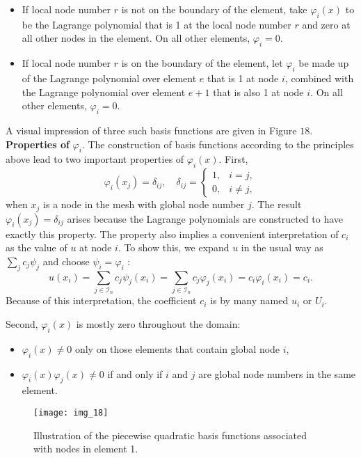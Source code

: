 \documentclass[../main.tex]{subfiles}
\begin{document}
\begin{itemize}
	\item If local node number $r$ is not on the boundary of the element, take $\varphi_{i}(x)$ to be the Lagrange polynomial that is 1 at the local node number $r$ and zero at all other nodes in the element. On all other elements, $\varphi_{i}=0$.
	\item If local node number $r$ is on the boundary of the element, let $\varphi_{i}$ be made up of the Lagrange polynomial over element $e$ that is 1 at node $i$, combined with the Lagrange polynomial over element $e+1$ that is also 1 at node $i$. On all other elements, $\varphi_{i}=0$.
\end{itemize}
A visual impression of three such basis functions are given in Figure $18 .$
\bigbreak
\noindent \textbf{Properties of} $\varphi_{i}$. The construction of basis functions according to the principles above lead to two important properties of $\varphi_{i}(x)$. First,
\begin{equation}\label{eqa52}
	\varphi_{i}\left(x_{j}\right)=\delta_{i j}, \quad \delta_{i j}= \begin{cases}1, & i=j, \\ 0, & i \neq j,\end{cases}
\end{equation}
when $x_{j}$ is a node in the mesh with global node number $j$. The result $\varphi_{i}\left(x_{j}\right)=\delta_{i j}$ arises because the Lagrange polynomials are constructed to have exactly this property. The property also implies a convenient interpretation of $c_{i}$ as the value of $u$ at node $i$. To show this, we expand $u$ in the usual way as $\sum_{j} c_{j} \psi_{j}$ and choose $\psi_{i}=\varphi_{i}$ :
$$
u\left(x_{i}\right)=\sum_{j \in \mathcal{I}_{n}} c_{j} \psi_{j}\left(x_{i}\right)=\sum_{j \in \mathcal{I}_{n}} c_{j} \varphi_{j}\left(x_{i}\right)=c_{i} \varphi_{i}\left(x_{i}\right)=c_{i}.
$$
Because of this interpretation, the coefficient $c_{i}$ is by many named $u_{i}$ or $U_{i}$.

Second, $\varphi_{i}(x)$ is mostly zero throughout the domain:
\begin{itemize}
	\item $\varphi_{i}(x) \neq 0$ only on those elements that contain global node $i$,
	\item $\varphi_{i}(x) \varphi_{j}(x) \neq 0$ if and only if $i$ and $j$ are global node numbers in the same element.
\end{itemize}
\begin{figure}[H]
	\centering
	\texttt{[image: img\_18]}
	\caption{Illustration of the piecewise quadratic basis functions associated
		with nodes in element 1.}
	\label{fig:img_18}
\end{figure}
\end{document}
